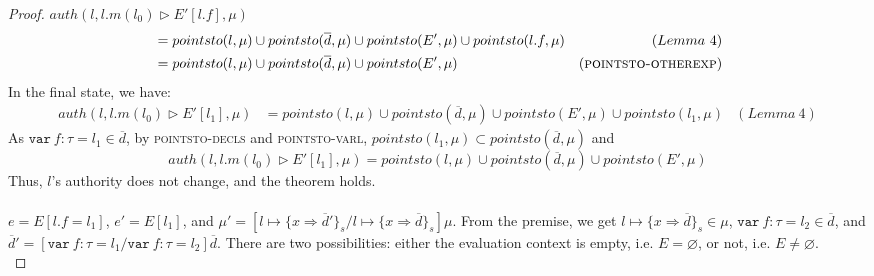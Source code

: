 \documentclass{llncs}
\newcommand{\keywadj}[1]{\mathtt{#1}}
\newcommand{\keyw}[1]{\keywadj{#1}~}
\begin{document}
\begin{proof}
\noindent$auth(l, l.m(l_0) \rhd E'[l.f], \mu)$
\vspace{-7pt}
\begin{align*}
&= pointsto(l, \mu) \cup pointsto(\overline{d}, \mu) \cup pointsto(E', \mu) \cup pointsto(l.f, \mu) & (Lemma~4)\\
&= pointsto(l, \mu) \cup pointsto(\overline{d}, \mu) \cup pointsto(E', \mu) & (\textsc{pointsto-otherexp})
\end{align*}
In the final state, we have:
\begin{align*}
auth(l, l.m(l_0) \rhd E'[l_1], \mu) &= pointsto(l, \mu) \cup pointsto(\overline{d}, \mu) \cup pointsto(E', \mu) \cup pointsto(l_1, \mu) & (Lemma~4)
\end{align*}
As $\keyw{var} f : \tau = l_1 \in \overline{d}$, by \textsc{pointsto-decls} and \textsc{pointsto-varl}, $pointsto(l_1, \mu) \subset pointsto(\overline{d}, \mu)$ and
\[
auth(l, l.m(l_0) \rhd E'[l_1], \mu) = pointsto(l, \mu) \cup pointsto(\overline{d}, \mu) \cup pointsto(E', \mu)
\]
Thus, $l$'s authority does not change, and the theorem holds.\\\\


\noindent{}
$e = E[l.f = l_1]$, $e' = E[l_1]$, and $\mu' = [l \mapsto \{ x \Rightarrow \overline{d}' \}_{s}/l \mapsto \{ x \Rightarrow \overline{d} \}_{s}]\mu$. From the premise, we get $l \mapsto \{ x \Rightarrow \overline{d} \}_{s} \in \mu$, $\keyw{var} f:\tau = l_2 \in \overline{d}$, and $\overline{d}' = [\keyw{var} f : \tau = l_1/\keyw{var} f:\tau = l_2]\overline{d}$. There are two possibilities: either the evaluation context is empty, i.e. $E = \varnothing$, or not, i.e. $E \not= \varnothing$.\\


\end{proof}
\end{document}
